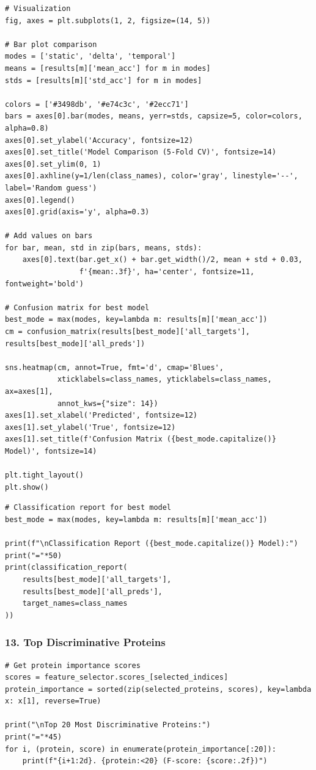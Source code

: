 \begin{lstlisting}
# Visualization
fig, axes = plt.subplots(1, 2, figsize=(14, 5))
 
# Bar plot comparison
modes = ['static', 'delta', 'temporal']
means = [results[m]['mean_acc'] for m in modes]
stds = [results[m]['std_acc'] for m in modes]
 
colors = ['#3498db', '#e74c3c', '#2ecc71']
bars = axes[0].bar(modes, means, yerr=stds, capsize=5, color=colors, alpha=0.8)
axes[0].set_ylabel('Accuracy', fontsize=12)
axes[0].set_title('Model Comparison (5-Fold CV)', fontsize=14)
axes[0].set_ylim(0, 1)
axes[0].axhline(y=1/len(class_names), color='gray', linestyle='--', label='Random guess')
axes[0].legend()
axes[0].grid(axis='y', alpha=0.3)
 
# Add values on bars
for bar, mean, std in zip(bars, means, stds):
    axes[0].text(bar.get_x() + bar.get_width()/2, mean + std + 0.03,
                 f'{mean:.3f}', ha='center', fontsize=11, fontweight='bold')
 
# Confusion matrix for best model
best_mode = max(modes, key=lambda m: results[m]['mean_acc'])
cm = confusion_matrix(results[best_mode]['all_targets'], results[best_mode]['all_preds'])
 
sns.heatmap(cm, annot=True, fmt='d', cmap='Blues',
            xticklabels=class_names, yticklabels=class_names, ax=axes[1],
            annot_kws={"size": 14})
axes[1].set_xlabel('Predicted', fontsize=12)
axes[1].set_ylabel('True', fontsize=12)
axes[1].set_title(f'Confusion Matrix ({best_mode.capitalize()} Model)', fontsize=14)
 
plt.tight_layout()
plt.show()
\end{lstlisting}
 
\begin{lstlisting}
# Classification report for best model
best_mode = max(modes, key=lambda m: results[m]['mean_acc'])
 
print(f"\nClassification Report ({best_mode.capitalize()} Model):")
print("="*50)
print(classification_report(
    results[best_mode]['all_targets'],
    results[best_mode]['all_preds'],
    target_names=class_names
))
\end{lstlisting}
 
\subsubsection*{13. Top Discriminative Proteins}
 
\begin{lstlisting}
# Get protein importance scores
scores = feature_selector.scores_[selected_indices]
protein_importance = sorted(zip(selected_proteins, scores), key=lambda x: x[1], reverse=True)
 
print("\nTop 20 Most Discriminative Proteins:")
print("="*45)
for i, (protein, score) in enumerate(protein_importance[:20]):
    print(f"{i+1:2d}. {protein:<20} (F-score: {score:.2f})")
\end{lstlisting}
 
